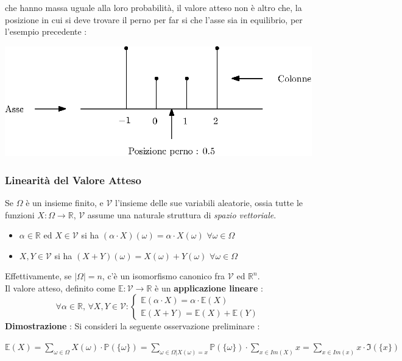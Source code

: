 \documentclass[12pt, letterpaper]{article}
\newcommand{\E}{{\mathbb E}}
\newcommand{\Prob}{{\mathbb P}}
\begin{document}
che hanno massa uguale alla loro probabilità, il valore atteso non è altro che, la posizione in cui si deve trovare 
il perno per far si che l'asse sia in equilibrio, per l'esempio precedente :\begin{center}
    \includegraphics[scale=1.5]{images/istogrammaFisico.eps}
\end{center}
\subsubsection{Linearità del Valore Atteso}\label{linE}
Se \(\Omega\) è un insieme finito, e \(\mathcal{V}\) l'insieme delle sue variabili aleatorie, ossia 
tutte le funzioni \(X:\Omega\rightarrow\mathbb{R}\), \(\mathcal{V}\) assume una naturale struttura 
di \textit{spazio vettoriale}.\begin{itemize}
    \item \(\alpha\in\mathbb{R}\) ed \(X\in\mathcal{V}\) si ha \((\alpha \cdot  X)(\omega)=\alpha\cdot X(\omega)\)\hphantom{text} \(\forall \omega\in\Omega\)
    \item \(X,Y\in\mathcal{V}\) si ha \((X+Y)(\omega)=X(\omega)+Y(\omega)\)\hphantom{t-ext} \(\forall \omega\in\Omega\)
\end{itemize}
Effettivamente, se \(|\Omega|=n\), c'è un isomorfismo canonico fra \(\mathcal{V}\) ed \(\mathbb{R}^n\).\\
Il valore atteso, definito come \(\mathbb{E}:\mathcal{V}\rightarrow\mathbb{R}\) è un \textbf{applicazione lineare} :
\begin{equation}\forall \alpha\in\mathbb{R}\text{, }\forall X,Y\in \mathcal{V} :
    \begin{cases}
        \mathbb{E}(\alpha \cdot X)=\alpha\cdot \mathbb{E}(X)\\
        \mathbb{E}(X+Y)=\mathbb{E}(X)+\mathbb{E}(Y)
    \end{cases}
\end{equation}
\textbf{Dimostrazione }: Si consideri la seguente osservazione preliminare :\begin{center}
    \(
    \E(X)=\displaystyle\sum_{\omega\in\Omega}X(\omega)\cdot\Prob(\{\omega\})
    =\sum_{\omega\in\Omega|X(\omega)=x}\Prob(\{\omega\})\cdot\sum_{x\in Im(X)}x=
    \displaystyle\sum_{x\in Im(x)}x\cdot \Im(\{x\})
    \)
\end{center}
\end{document}
